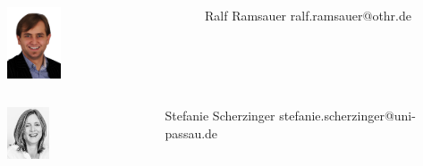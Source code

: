 \documentclass{beamer}
\begin{document}
\begin{frame}
\begin{minipage}[c]{1.0\linewidth}
	\end{minipage}
	\begin{minipage}[c]{1.0\linewidth}
		\begin{columns}
		\begin{column}{0.35\textwidth}
			\begin{center}
     		\includegraphics[width=0.3\textwidth]{pics/speakers_ralf.png}
			\end{center}
		\end{column}
		\begin{column}{0.7\textwidth}
		\begin{block}{Ralf Ramsauer}
			ralf.ramsauer@othr.de
		\end{block}
		\end{column}
		\end{columns}
	\end{minipage}
	\begin{minipage}[c]{1.0\linewidth}
		\begin{columns}
		\begin{column}{0.35\textwidth}
			\begin{center}
     		\includegraphics[width=0.3\textwidth]{pics/speakers_scherzinger.jpeg}
			\end{center}
		\end{column}
		\begin{column}{0.7\textwidth}
		\begin{block}{Stefanie Scherzinger}
			stefanie.scherzinger@uni-passau.de
		\end{block}
		\end{column}
		\end{columns}
	\end{minipage}
	\end{frame}
\end{document}
